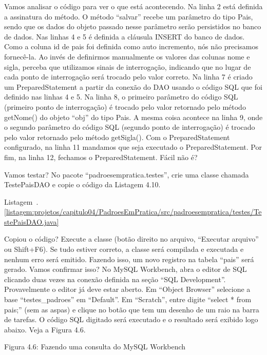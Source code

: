 Vamos analisar o código para ver o que está acontecendo. Na linha 2 está definida a assinatura do método. O método ``salvar'' recebe um parâmetro do tipo Pais, sendo que os dados do objeto passado nesse parâmetro serão persistidos no banco de dados. Nas linhas 4 e 5 é definida a cláusula INSERT do banco de dados. Como a coluna id de pais foi definida como auto incremento, nós não precisamos fornecê-la. Ao invés de definirmos manualmente os valores das colunas nome e sigla, perceba que utilizamos sinais de interrogação, indicando que no lugar de cada ponto de interrogação será trocado pelo valor correto. Na linha 7 é criado um PreparedStatement a partir da conexão do DAO usando o código SQL que foi definido nas linhas 4 e 5. Na linha 8, o primeiro parâmetro do código SQL (primeiro ponto de interrogação) é trocado pelo valor retornado pelo método getNome() do objeto ``obj'' do tipo Pais. A mesma coisa acontece na linha 9, onde o segundo parâmetro do código SQL (segundo ponto de interrogação) é trocado pelo valor retornado pelo método getSigla(). Com o PreparedStatement configurado, na linha 11 mandamos que seja executado o PreparedStatement. Por fim, na linha 12, fechamos o PreparedStatement. Fácil não é?

Vamos testar? No pacote ``padroesempratica.testes'', crie uma classe chamada TestePaisDAO e copie o código da Listagem 4.10.

Listagem~\thechapter.\ref{listagem:projetos/capitulo04/PadroesEmPratica/src/padroesempratica/testes/TestePaisDAO.java}

Copiou o código? Execute a classe (botão direito no arquivo, ``Executar arquivo'' ou Shift+F6). Se tudo estiver correto, a classe será compilada e executada e nenhum erro será emitido. Fazendo isso, um novo registro na tabela ``pais'' será gerado. Vamos confirmar isso? No MySQL Workbench, abra o editor de SQL clicando duas vezes na conexão definida na seção ``SQL Development''. Provavelmente o editor já deve estar aberto. Em ``Object Browser'' selecione a base ``testes\_padroes'' em ``Default''. Em ``Scratch'', entre digite ``select * from pais;'' (sem as aspas) e clique no botão que tem um desenho de um raio na barra de tarefas. O código SQL digitado será executado e o resultado será exibido logo abaixo. Veja a Figura 4.6.

Figura 4.6: Fazendo uma consulta do MySQL Workbench
 
